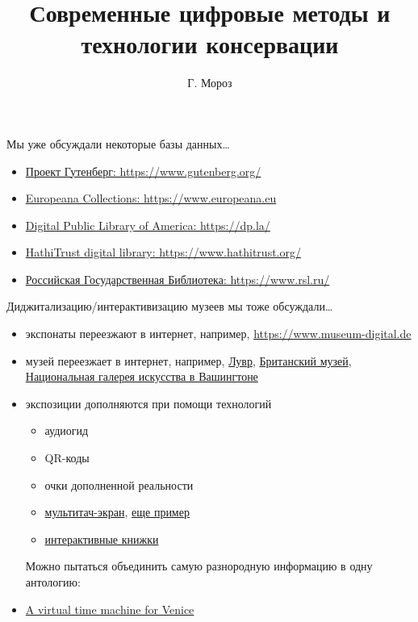 \documentclass[13pt, t]{beamer}
\title{\huge Современные цифровые методы и технологии консервации}
\author[shortname]{Г. Мороз }
\date{\begin{center} 
\large 20 апреля 2018 г.
\end{center}}
\begin{document}
\begin{frame}[plain]
\maketitle
\end{frame}


\begin{frame}{Мы уже обсуждали некоторые базы данных…}
\begin{itemize}
\item \href{https://www.gutenberg.org/}{\alert{Проект Гутенберг: https://www.gutenberg.org/}}
\item \href{https://www.europeana.eu}{\alert{Europeana Collections: https://www.europeana.eu}}
\item \href{https://dp.la/}{\alert{Digital Public Library of America: https://dp.la/}}
\item \href{https://www.hathitrust.org/}{\alert{HathiTrust digital library: https://www.hathitrust.org/}}
\item \href{https://www.rsl.ru/}{\alert{Российская Государственная Библиотека: https://www.rsl.ru/}}
\end{itemize}
\end{frame}

\begin{frame}{Диджитализацию/интерактивизацию музеев мы тоже обсуждали…}
\begin{itemize}
\item экспонаты переезжают в интернет, например, \href{https://www.museum-digital.de}{https://www.museum-digital.de}
\item музей переезжает в интернет, например, \href{http://www.louvre.fr/en/visites-en-ligne\#tabs}{Лувр}, \href{http://www.britishmuseum.org/with_google.aspx}{Британский музей}, \href{http://www.nga.gov/exhibitions/webtours.htm}{Национальная галерея искусства в Вашингтоне}
\item экспозиции дополняются при помощи технологий
\begin{itemize}
\item аудиогид
\item QR-коды
\item очки дополненной реальности
\item \href{https://www.youtube.com/watch?time_continue=154&v=XYRjaZl08lQ}{мультитач-экран}, \href{https://www.youtube.com/watch?v=qWJqd6lyJ-E}{еще пример}
\item \href{https://www.youtube.com/watch?v=BmadTQNrAeA}{интерактивные книжки}
\end{itemize}
\vfill 
Можно пытаться объединить самую разнородную информацию в одну антологию:
\item \href{https://www.youtube.com/watch?time_continue=133&v=uQQGgYPRWfs}{A virtual time machine for Venice}
\end{itemize}
\end{frame}
\end{document}
